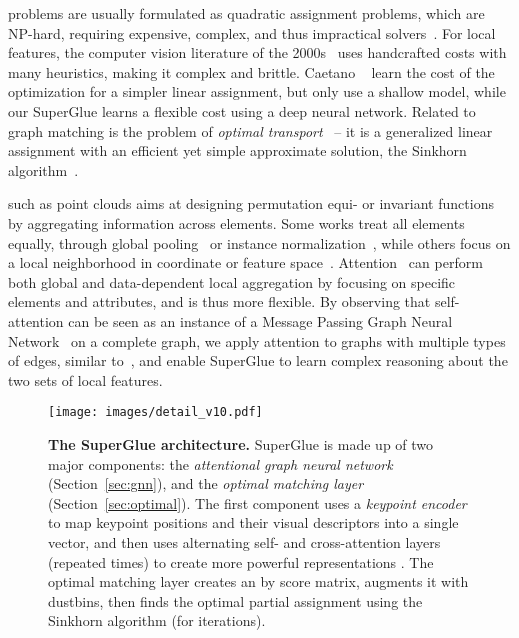 \documentclass[10pt,twocolumn,letterpaper]{article}
\newcommand{\PAR}[1]{\vskip4pt \noindent{\bf #1~}}
\renewcommand{\*}[1]{\mathbf{#1}}
\newcommand{\0}{\phantom{0}}
\begin{document}
\PAR{Graph matching} problems are usually formulated as quadratic assignment problems, which are NP-hard, requiring expensive, complex, and thus impractical solvers~\cite{loiola2007survey}. For local features, the computer vision literature of the 2000s~\cite{berg2005shape, leordeanu2005spectral, torresani2008feature} uses handcrafted costs with many heuristics, making it complex and brittle. Caetano \etal~\cite{caetano2009learning} learn the cost of the optimization for a simpler linear assignment, but only use a shallow model, while our SuperGlue learns a flexible cost using a deep neural network. Related to graph matching is the problem of \emph{optimal transport}~\cite{villani2008optimal} -- it is a generalized linear assignment with an efficient yet simple approximate solution, the Sinkhorn algorithm~\cite{sinkhorn1967concerning, cuturi2013sinkhorn, peyre2019computational}.

\PAR{Deep learning for sets} such as point clouds aims at designing permutation equi- or invariant functions by aggregating information across elements. Some works treat all elements equally, through global pooling~\cite{zaheer2017deep, qi2017pointnet, deng2018ppfnet} or instance normalization~\cite{ulyanov2016instance, moo2018learning, luo2019contextdesc}, while others focus on a local neighborhood in coordinate or feature space~\cite{qi2017pointnet++, dgcnn}. Attention~\cite{vaswani2017attention, wang2018non, velickovic2018graph, lee2019set} can perform both global and data-dependent local aggregation by focusing on specific elements and attributes, and is thus more flexible.
By observing that self-attention can be seen as an instance of a Message Passing Graph Neural Network~\cite{gilmer2017neural, battaglia2018relational} on a complete graph, we apply attention to graphs with multiple types of edges, similar to~\cite{li2019graph, zhang2019dual}, and enable SuperGlue to learn complex reasoning about the two sets of local features.
 
\begin{figure*}[!t]
\vspace{-.2in}
    \centering
    \texttt{[image: images/detail\_v10.pdf]}\begin{subfigure}{0.5\linewidth}
        \caption{\label{fig:detail-a}}\end{subfigure}\begin{subfigure}{0.5\linewidth}
        \caption{\label{fig:detail-b}}\end{subfigure}\vspace{-3mm}\caption{\textbf{The SuperGlue architecture.} SuperGlue is made up of two major components: the \emph{attentional graph neural network} (Section~\ref{sec:gnn}), and the \emph{optimal matching layer} (Section~\ref{sec:optimal}). The first component uses a \emph{keypoint encoder} to map keypoint positions  and their visual descriptors  into a single vector, and then uses alternating self- and cross-attention layers (repeated  times) to create more powerful representations . The optimal matching layer creates an  by  score matrix, augments it with dustbins, then finds the optimal partial assignment using the Sinkhorn algorithm (for  iterations).}
\label{fig:detail}\end{figure*}
\end{document}
